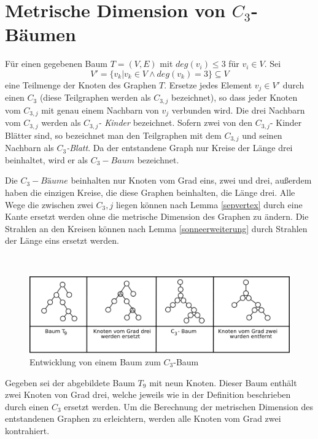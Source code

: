 \section{Metrische Dimension von $C_3$-Bäumen}
\begin{defi}
\label{C_{3} tree}
Für einen gegebenen Baum $T=(V,E)$ mit $deg(v_i)\leq 3$ für $v_i \in V$. Sei $$V'=\{v_k|v_k \in V \wedge deg(v_k)=3\}\subseteq V$$ eine Teilmenge der Knoten des Graphen $T$. Ersetze jedes Element $v_j \in V'$ durch einen $C_3$ (diese Teilgraphen werden als \emph{$C_{3,j}$} bezeichnet), so dass jeder Knoten vom $C_{3,j}$ mit genau einem Nachbarn von $v_j$ verbunden wird. Die drei Nachbarn vom $C_{3,j}$ werden als \emph{$C_{3,j}$- Kinder} bezeichnet. Sofern zwei von den $C_{3,j}$- Kinder Blätter sind, so bezeichnet man den Teilgraphen mit dem $C_{3,j}$ und seinen Nachbarn als \emph{$C_{3}$-Blatt}. Da der entstandene Graph nur Kreise der Länge drei beinhaltet, wird er als \emph{$C_3-Baum$} bezeichnet. 
   \end{defi}
   \begin{bem}
Die $C_3-Bäume$ beinhalten nur Knoten vom Grad eins, zwei und drei, außerdem haben die einzigen Kreise, die diese Graphen beinhalten, die Länge drei. Alle Wege die zwischen zwei $C_3,j$ liegen können nach Lemma \ref{sepvertex} durch eine Kante ersetzt werden ohne die metrische Dimension des Graphen zu ändern. Die Strahlen an den Kreisen können nach Lemma \ref{sonneerweiterung} durch Strahlen der Länge eins ersetzt werden.
\end{bem} 
\begin{bsp}~
\begin{figure}[h!]
		\centering 		 
   \includegraphics[width=428pt]{bilder/trees.pdf}
	\caption{Entwicklung von einem Baum zum $C_{3}$-Baum}
  	 \end{figure}
\end{bsp}
Gegeben sei der abgebildete Baum $T_9$ mit neun Knoten. Dieser Baum enthält zwei Knoten von Grad drei, welche jeweils wie in der Definition beschrieben durch einen $C_3$ ersetzt werden. Um die Berechnung der metrischen Dimension des entstandenen Graphen zu erleichtern, werden alle Knoten vom Grad zwei kontrahiert.
